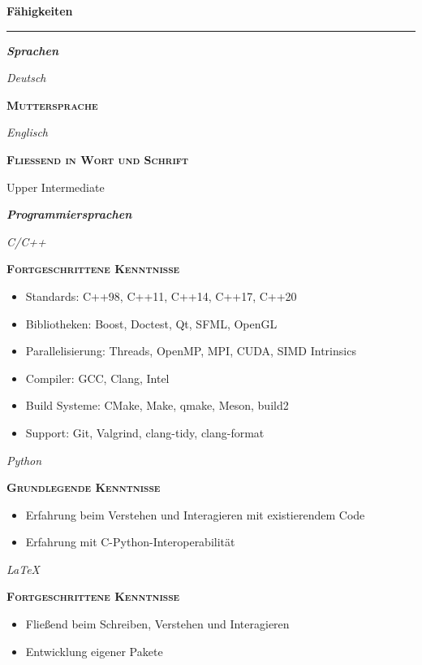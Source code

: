 \documentclass[8pt]{article}
\newcommand{\cvSectionStyle}{%
  \normalfont%
  \Large%
  \color{cvColor}%
  \bfseries%
  \sffamily%
}
\newcommand{\cvSubsectionStyle}{%
  \normalfont%
  \sffamily%
  \itshape%
  \bfseries%
}
\newcommand{\cvSection}[1]{%
  \smallskip%
  {%
    \cvSectionStyle #1%
  }\\[-0.5em]
  \rule{\linewidth}{0.8pt}%
  \par%
  \smallskip%
}
\newcommand{\cvSubsection}[1]{%
  \begin{tcolorbox}[left=0pt, top=0pt, bottom=0pt, right=0pt, boxsep=5pt, arc=5pt, frame code={}, colback=cvBackgroundColor]
    \cvSubsectionStyle #1%
  \end{tcolorbox}
}
\newenvironment{cvItemize}{%
  \begin{itemize}[itemsep=0mm, leftmargin=4mm]
}{%
  \end{itemize}
}
\newenvironment{cvSkillItem}[2]{
  \par
  \begin{minipage}[c]{0.2\linewidth}
    \raggedleft
    \normalfont
    \sffamily
    \itshape
    #1
  \end{minipage}
  \hspace{0.02\linewidth}
  \vrule
  \hspace{0.02\linewidth}
  \begin{minipage}[t]{0.74\linewidth}
    \sffamily\textsc{\color{cvColor} \textbf{#2}}\par
      \normalfont\footnotesize\sffamily
}{
  \end{minipage}
  \par%
  \vspace{\baselineskip}%
}
\begin{document}
  \cvSection{Fähigkeiten}
  \cvSubsection{Sprachen}
  \vspace{-1.8em}
  \begin{multicols}{2}
  \begin{cvSkillItem}{Deutsch}{Muttersprache}
  \end{cvSkillItem}
  \begin{cvSkillItem}{Englisch}{Fließend in Wort und Schrift}
    Upper Intermediate
  \end{cvSkillItem}
  \end{multicols}
  \vspace{-1em}

  \cvSubsection{Programmiersprachen}
  \vspace{-1.8em}
  \begin{multicols}{2}
  \begin{cvSkillItem}{C/C++}{Fortgeschrittene Kenntnisse}
    \begin{cvItemize}
      \item Standards: C++98, C++11, C++14, C++17, C++20
      \item Bibliotheken: Boost, Doctest, Qt, SFML, OpenGL
      \item Parallelisierung: Threads, OpenMP, MPI, CUDA, SIMD Intrinsics
      \item Compiler: GCC, Clang, Intel
      \item Build Systeme: CMake, Make, qmake, Meson, build2
      \item Support: Git, Valgrind, clang-tidy, clang-format
    \end{cvItemize}
  \end{cvSkillItem}
  \begin{cvSkillItem}{Python}{Grundlegende Kenntnisse}
    \begin{cvItemize}
      \item Erfahrung beim Verstehen und Interagieren mit existierendem Code
      \item Erfahrung mit C-Python-Interoperabilität
    \end{cvItemize}
  \end{cvSkillItem}
  \begin{cvSkillItem}{LaTeX}{Fortgeschrittene Kenntnisse}
    \begin{cvItemize}
      \item Fließend beim Schreiben, Verstehen und Interagieren
      \item Entwicklung eigener Pakete
    \end{cvItemize}
  \end{cvSkillItem}
  \end{multicols}
\end{document}
